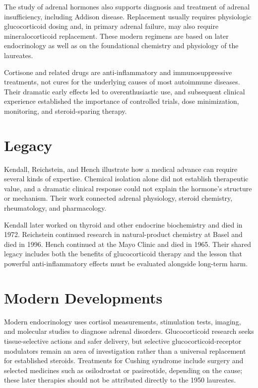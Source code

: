 The study of adrenal hormones also supports diagnosis and treatment of adrenal insufficiency, including Addison disease. Replacement usually requires physiologic glucocorticoid dosing and, in primary adrenal failure, may also require mineralocorticoid replacement. These modern regimens are based on later endocrinology as well as on the foundational chemistry and physiology of the laureates.

Cortisone and related drugs are anti-inflammatory and immunosuppressive treatments, not cures for the underlying causes of most autoimmune diseases. Their dramatic early effects led to overenthusiastic use, and subsequent clinical experience established the importance of controlled trials, dose minimization, monitoring, and steroid-sparing therapy.

\section{Legacy}

Kendall, Reichstein, and Hench illustrate how a medical advance can require several kinds of expertise. Chemical isolation alone did not establish therapeutic value, and a dramatic clinical response could not explain the hormone's structure or mechanism. Their work connected adrenal physiology, steroid chemistry, rheumatology, and pharmacology.

Kendall later worked on thyroid and other endocrine biochemistry and died in 1972. Reichstein continued research in natural-product chemistry at Basel and died in 1996. Hench continued at the Mayo Clinic and died in 1965. Their shared legacy includes both the benefits of glucocorticoid therapy and the lesson that powerful anti-inflammatory effects must be evaluated alongside long-term harm.

\section{Modern Developments}

Modern endocrinology uses cortisol measurements, stimulation tests, imaging, and molecular studies to diagnose adrenal disorders. Glucocorticoid research seeks tissue-selective actions and safer delivery, but selective glucocorticoid-receptor modulators remain an area of investigation rather than a universal replacement for established steroids. Treatments for Cushing syndrome include surgery and selected medicines such as osilodrostat or pasireotide, depending on the cause; these later therapies should not be attributed directly to the 1950 laureates.

